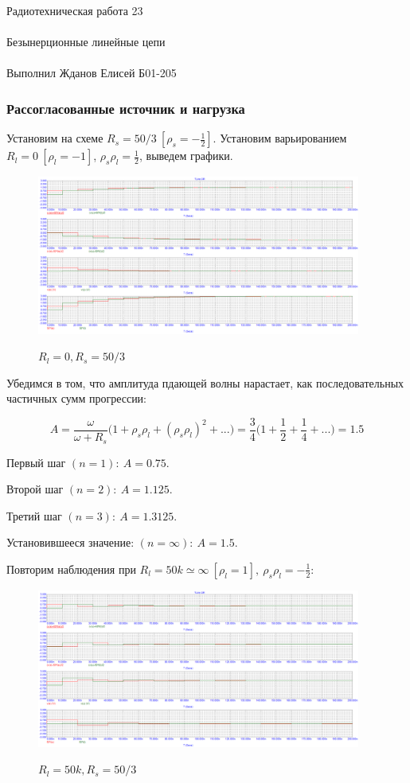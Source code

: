 \documentclass{astroedu-lab}
\begin{document}
\begin{problem}{\huge Радиотехническая работа 23\\\\Безынерционные линейные цепи\\\\Выполнил Жданов Елисей Б01-205}
\subsubsection{Рассогласованные источник и нагрузка}

Установим на схеме $R_s = 50/3 \: [\rho_s = -\frac{1}{2}]$. Установим варьированием $R_l = 0 \: [\rho_l = -1]$, $\rho_s \rho_l = \frac{1}{2}$, выведем графики.

\begin{figure}[h!]
\centering
\includegraphics[width=0.95\textwidth]{картинки/Graph8.png}
\label{fig:Image1}
\caption{$R_l = 0, R_s = 50/3$}
\end{figure}

Убедимся в том, что амплитуда пдающей волны нарастает, как последовательных частичных сумм прогрессии:

\[A = \frac{\omega}{\omega + R_s} \Big( 1 + \rho_s \rho_l + (\rho_s \rho_l)^2 + ...\Big) = \frac{3}{4} \Big( 1 + \frac{1}{2} + \frac{1}{4} + ... \Big) = 1.5\]

Первый шаг $(n = 1): \: A = 0.75$.

Второй шаг $(n = 2): \: A = 1.125$.

Третий шаг $(n = 3): \: A = 1.3125$.

Установившееся значение: $(n = \infty): \: A = 1.5$.

\newpage

Повторим наблюдения при $R_l = 50k \simeq \infty \: [\rho_l = 1], \: \rho_s \rho_l = -\frac{1}{2}$:

\begin{figure}[h!]
\centering
\includegraphics[width=0.95\textwidth]{картинки/Graph9.png}
\label{fig:Image1}
\caption{$R_l = 50k, R_s = 50/3$}
\end{figure}


\end{problem}
\end{document}
